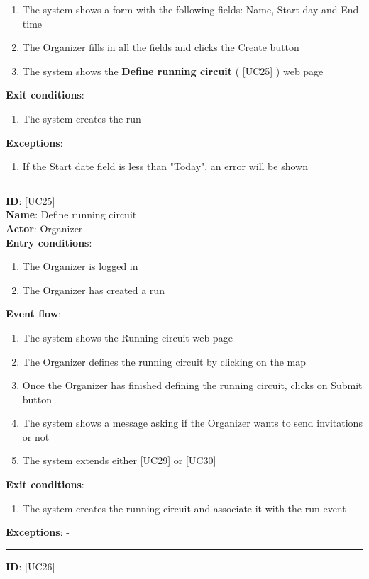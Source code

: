 \documentclass[a4paper, hidelinks, 12pt]{report}
\newcommand\usecase[1]{ [UC#1] }
\begin{document}
\begin{itemize}
\begin{enumerate}
			\item{The system shows a form with the following fields: Name, Start day and End time}
			\item{The Organizer fills in all the fields and clicks the Create button}
			\item{The system shows the \textbf{Define running circuit} (\usecase{25}) web page}
		\end{enumerate}
		\textbf{Exit conditions}:
		\begin{enumerate}
			\item{The system creates the run}
		\end{enumerate}
		\textbf{Exceptions}:
		\begin{enumerate}
			\item{If the Start date field is less than "Today", an error will be shown}
		\end{enumerate}
		\rule{\linewidth}{0.4pt}
		\textbf{ID}: \usecase{25} \\
		\textbf{Name}: Define running circuit \\
		\textbf{Actor}: Organizer \\
		\textbf{Entry conditions}:
		\begin{enumerate}
			\item{The Organizer is logged in}
			\item{The Organizer has created a run}
		\end{enumerate}
		\textbf{Event flow}:
		\begin{enumerate}
			\item{The system shows the Running circuit web page}
			\item{The Organizer defines the running circuit by clicking on the map}
			\item{Once the Organizer has finished defining the running circuit, clicks on Submit button}
			\item{The system shows a message asking if the Organizer wants to send invitations or not}
			\item{The system extends either \usecase{29} or \usecase{30}}
		\end{enumerate}
		\textbf{Exit conditions}:
		\begin{enumerate}
			\item{The system creates the running circuit and associate it with the run event}
		\end{enumerate}
		\textbf{Exceptions}: - \\
		\rule{\linewidth}{0.4pt}
		\textbf{ID}: \usecase{26} \\

\end{itemize}
\end{document}
